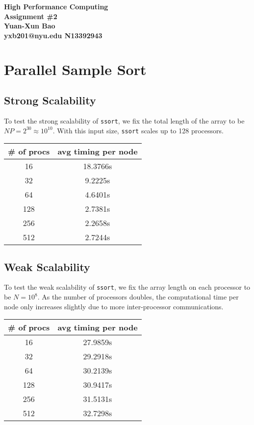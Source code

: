\documentclass[12pt]{article}
\begin{document}
\begin{center}

\large \textbf{%
High Performance Computing \\ Assignment \#2 \\ Yuan-Xun Bao \\ yxb201@nyu.edu \quad N13392943}
\end{center}

\section{Parallel Sample Sort}

\subsection{Strong Scalability}
To test the strong scalability of \verb|ssort|, we fix the total length of the array to be $NP = 2^{30} \approx 10^{10}$.
With this input size, \verb|ssort| scales up to 128 processors. 

\begin{center}
  \begin{tabular}{ | c | c | }
    \hline
    \# of procs & avg timing per node  \\ \hline
    16  & 18.3766s  \\ \hline
    32  & 9.2225s \\ \hline
    64  & 4.6401s  \\ \hline
    128 & 2.7381s \\ \hline
    256 & 2.2658s \\ \hline
    512 & 2.7244s \\
    \hline
  \end{tabular}
\end{center}

\subsection{Weak Scalability}

To test the weak scalability of \verb|ssort|, we fix the array length on each processor to be $N = 10^8$.
As the number of processors doubles, the computational time per node only increases slightly due to more inter-processor communications.

\begin{center}
  \begin{tabular}{ | c | c | }
    \hline
    \# of procs & avg timing per node  \\ \hline
    16  & 27.9859s  \\ \hline
    32  & 29.2918s \\ \hline
    64  & 30.2139s  \\ \hline
    128 & 30.9417s \\ \hline
    256 & 31.5131s \\ \hline
    512 & 32.7298s \\
    \hline
  \end{tabular}
\end{center}
\end{document}
